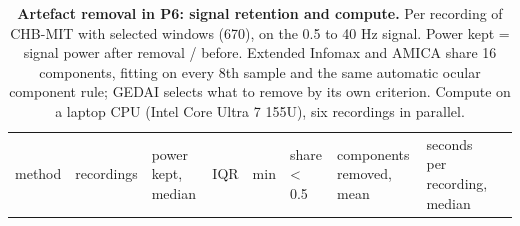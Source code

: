 \documentclass[11pt,a4paper]{article}
\begin{document}
\begingroup\footnotesize\setlength{\tabcolsep}{3pt}

\begin{longtable}[]{@{}
  >{\raggedright\arraybackslash}p{}
  >{\raggedright\arraybackslash}p{}
  >{\raggedright\arraybackslash}p{}
  >{\raggedright\arraybackslash}p{}
  >{\raggedright\arraybackslash}p{}
  >{\raggedright\arraybackslash}p{}
  >{\raggedright\arraybackslash}p{}
  >{\raggedright\arraybackslash}p{}
  >{\raggedright\arraybackslash}p{}@{}}
\caption{\textbf{Artefact removal in P6: signal retention and compute.} Per recording of CHB-MIT with selected windows (670), on the 0.5 to 40 Hz signal. Power kept = signal power after removal / before. Extended Infomax and AMICA share 16 components, fitting on every 8th sample and the same automatic ocular component rule; GEDAI selects what to remove by its own criterion. Compute on a laptop CPU (Intel Core Ultra 7 155U), six recordings in parallel.}\tabularnewline
\toprule\noalign{}
\begin{minipage}[b]{\linewidth}\raggedright
method
\end{minipage} & \begin{minipage}[b]{\linewidth}\raggedright
recordings
\end{minipage} & \begin{minipage}[b]{\linewidth}\raggedright
power kept, median
\end{minipage} & \begin{minipage}[b]{\linewidth}\raggedright
IQR
\end{minipage} & \begin{minipage}[b]{\linewidth}\raggedright
min
\end{minipage} & \begin{minipage}[b]{\linewidth}\raggedright
share \textless{} 0.5
\end{minipage} & \begin{minipage}[b]{\linewidth}\raggedright
components removed, mean
\end{minipage} & \begin{minipage}[b]{\linewidth}\raggedright
seconds per recording, median
\end{minipage} & \begin{minipage}[b]{\linewidth}\raggedright

\end{minipage}
\end{longtable}
\end{document}
